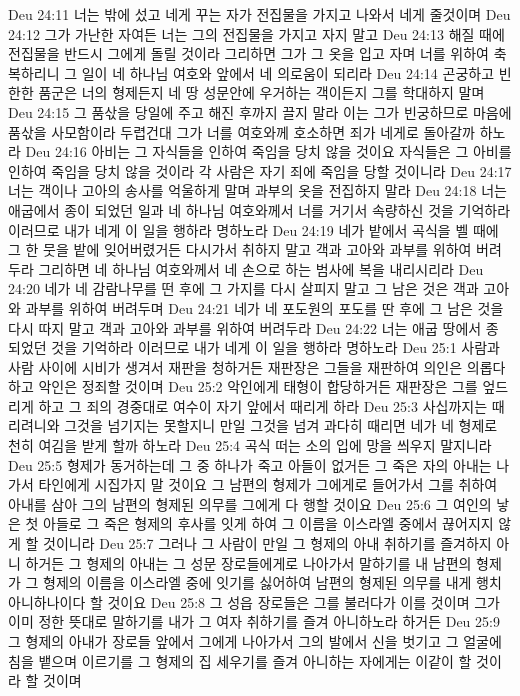 Deu 24:11  너는 밖에 섰고 네게 꾸는 자가 전집물을 가지고 나와서 네게 줄것이며
Deu 24:12  그가 가난한 자여든 너는 그의 전집물을 가지고 자지 말고
Deu 24:13  해질 때에 전집물을 반드시 그에게 돌릴 것이라 그리하면 그가 그 옷을 입고 자며 너를 위하여 축복하리니 그 일이 네 하나님 여호와 앞에서 네 의로움이 되리라
Deu 24:14  곤궁하고 빈한한 품군은 너의 형제든지 네 땅 성문안에 우거하는 객이든지 그를 학대하지 말며
Deu 24:15  그 품삯을 당일에 주고 해진 후까지 끌지 말라 이는 그가 빈궁하므로 마음에 품삯을 사모함이라 두렵건대 그가 너를 여호와께 호소하면 죄가 네게로 돌아갈까 하노라
Deu 24:16  아비는 그 자식들을 인하여 죽임을 당치 않을 것이요 자식들은 그 아비를 인하여 죽임을 당치 않을 것이라 각 사람은 자기 죄에 죽임을 당할 것이니라
Deu 24:17  너는 객이나 고아의 송사를 억울하게 말며 과부의 옷을 전집하지 말라
Deu 24:18  너는 애굽에서 종이 되었던 일과 네 하나님 여호와께서 너를 거기서 속량하신 것을 기억하라 이러므로 내가 네게 이 일을 행하라 명하노라
Deu 24:19  네가 밭에서 곡식을 벨 때에 그 한 뭇을 밭에 잊어버렸거든 다시가서 취하지 말고 객과 고아와 과부를 위하여 버려두라 그리하면 네 하나님 여호와께서 네 손으로 하는 범사에 복을 내리시리라
Deu 24:20  네가 네 감람나무를 떤 후에 그 가지를 다시 살피지 말고 그 남은 것은 객과 고아와 과부를 위하여 버려두며
Deu 24:21  네가 네 포도원의 포도를 딴 후에 그 남은 것을 다시 따지 말고 객과 고아와 과부를 위하여 버려두라
Deu 24:22  너는 애굽 땅에서 종 되었던 것을 기억하라 이러므로 내가 네게 이 일을 행하라 명하노라
Deu 25:1  사람과 사람 사이에 시비가 생겨서 재판을 청하거든 재판장은 그들을 재판하여 의인은 의롭다 하고 악인은 정죄할 것이며
Deu 25:2  악인에게 태형이 합당하거든 재판장은 그를 엎드리게 하고 그 죄의 경중대로 여수이 자기 앞에서 때리게 하라
Deu 25:3  사십까지는 때리려니와 그것을 넘기지는 못할지니 만일 그것을 넘겨 과다히 때리면 네가 네 형제로 천히 여김을 받게 할까 하노라
Deu 25:4  곡식 떠는 소의 입에 망을 씌우지 말지니라
Deu 25:5  형제가 동거하는데 그 중 하나가 죽고 아들이 없거든 그 죽은 자의 아내는 나가서 타인에게 시집가지 말 것이요 그 남편의 형제가 그에게로 들어가서 그를 취하여 아내를 삼아 그의 남편의 형제된 의무를 그에게 다 행할 것이요
Deu 25:6  그 여인의 낳은 첫 아들로 그 죽은 형제의 후사를 잇게 하여 그 이름을 이스라엘 중에서 끊어지지 않게 할 것이니라
Deu 25:7  그러나 그 사람이 만일 그 형제의 아내 취하기를 즐겨하지 아니 하거든 그 형제의 아내는 그 성문 장로들에게로 나아가서 말하기를 내 남편의 형제가 그 형제의 이름을 이스라엘 중에 잇기를 싫어하여 남편의 형제된 의무를 내게 행치 아니하나이다 할 것이요
Deu 25:8  그 성읍 장로들은 그를 불러다가 이를 것이며 그가 이미 정한 뜻대로 말하기를 내가 그 여자 취하기를 즐겨 아니하노라 하거든
Deu 25:9  그 형제의 아내가 장로들 앞에서 그에게 나아가서 그의 발에서 신을 벗기고 그 얼굴에 침을 뱉으며 이르기를 그 형제의 집 세우기를 즐겨 아니하는 자에게는 이같이 할 것이라 할 것이며
